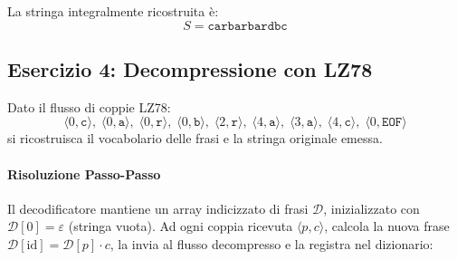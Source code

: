La stringa integralmente ricostruita \`e:
\begin{equation}
  S = \texttt{carbarbardbc}
\end{equation}

\FloatBarrier
\subsection{Esercizio 4: Decompressione con LZ78}
\label{subsec:es4-lz78-uncompress}

\begin{example}
Dato il flusso di coppie LZ78:
\begin{equation}
  \langle 0, \texttt{c} \rangle, \; \langle 0, \texttt{a} \rangle, \; \langle 0, \texttt{r} \rangle, \; \langle 0, \texttt{b} \rangle, \; \langle 2, \texttt{r} \rangle, \; \langle 4, \texttt{a} \rangle, \; \langle 3, \texttt{a} \rangle, \; \langle 4, \texttt{c} \rangle, \; \langle 0, \texttt{EOF} \rangle
\end{equation}
si ricostruisca il vocabolario delle frasi e la stringa originale emessa.
\end{example}

\paragraph{Risoluzione Passo-Passo}
Il decodificatore mantiene un array indicizzato di frasi $\mathcal{D}$, inizializzato con $\mathcal{D}[0] = \varepsilon$ (stringa vuota). Ad ogni coppia ricevuta $\langle p, c \rangle$, calcola la nuova frase $\mathcal{D}[\text{id}] = \mathcal{D}[p] \cdot c$, la invia al flusso decompresso e la registra nel dizionario:


